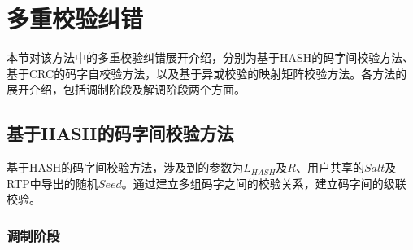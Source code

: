 \section{多重校验纠错}
\label{chap:hash:robustness}

本节对该方法中的多重校验纠错展开介绍，分别为基于HASH的码字间校验方法、基于CRC的码字自校验方法，以及基于异或校验的映射矩阵校验方法。各方法的展开介绍，包括调制阶段及解调阶段两个方面。

\subsection{基于HASH的码字间校验方法}
\label{chap:hash:robustness:hash}

基于HASH的码字间校验方法，涉及到的参数为$L_{HASH}$及$R$、用户共享的$Salt$及RTP中导出的随机$Seed$。通过建立多组码字之间的校验关系，建立码字间的级联校验。

\subsubsection{调制阶段}
\label{chap:hash:robustness:hash:modulation}

